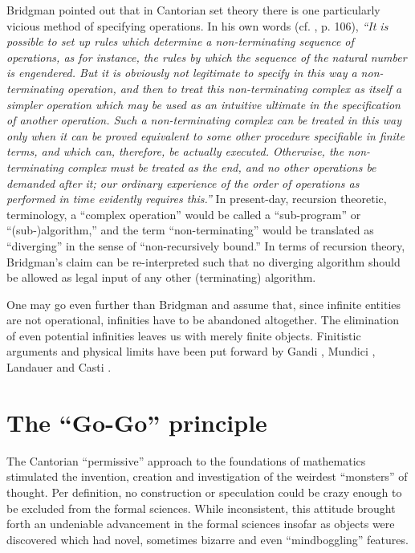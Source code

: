 Bridgman pointed out that in Cantorian set theory there is one
particularly vicious method of specifying operations. In his own words
(cf.
\cite{bridgman}, p. 106),
{\em ``It is possible to set up rules which determine a non-terminating
sequence of operations, as for instance, the rules by which the sequence
of the natural number is engendered. But it is obviously not legitimate
to specify in this way a non-terminating operation, and then to treat
this non-terminating complex as itself a simpler operation which may be
used as an intuitive ultimate in the specification of another operation.
Such a non-terminating complex can be treated in this way only when it
can be proved equivalent to some other procedure specifiable in finite
terms, and which can, therefore, be actually executed. Otherwise, the
non-terminating complex must be treated as the end, and no other
operations be demanded after it; our ordinary experience of the order of
operations as performed in time evidently requires this.''}
In present-day, recursion theoretic, terminology, a ``complex
operation'' would be called a
``sub-program'' or ``(sub-)algorithm,'' and the term ``non-terminating''
would be translated as
``diverging'' in the sense of ``non-recursively bound.'' In terms of
recursion theory, Bridgman's claim can be re-interpreted such that no
diverging algorithm should  be allowed as legal input of any other
(terminating) algorithm.

One may go even further than Bridgman and assume that, since infinite
entities are not operational, infinities have to be
abandoned altogether.
The elimination of even potential
infinities leaves us with merely finite objects.
Finitistic arguments and physical limits have been put forward
by Gandi
\cite{gandy1,gandy2},
 Mundici \cite{mundici}, Landauer \cite{landauer-onlim} and Casti
\cite{casti-onlim}.



\section{The ``Go-Go'' principle}

The Cantorian ``permissive'' approach to the foundations of
mathematics stimulated the
invention, creation and investigation of the weirdest ``monsters'' of
thought.
Per definition, no construction or speculation could be crazy
enough to be
excluded from the formal sciences.
While inconsistent, this attitude brought forth an undeniable
advancement in the formal sciences insofar as objects were discovered
which had novel, sometimes bizarre and even ``mindboggling'' features.


